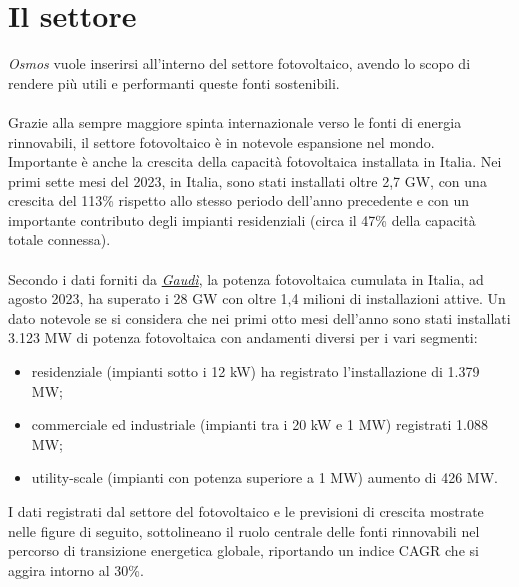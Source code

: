 \documentclass[a4paper, 12pt]{article}
\begin{document}
	\section{Il settore}
	\emph{Osmos} vuole inserirsi all'interno del settore fotovoltaico, avendo lo scopo di rendere più utili e performanti queste fonti sostenibili.\\\\
	Grazie alla sempre maggiore spinta internazionale verso le fonti di energia rinnovabili, il settore fotovoltaico è in notevole espansione nel mondo.\\
	Importante è anche la crescita della capacità fotovoltaica installata in Italia. Nei primi sette mesi del 2023, in Italia, sono stati installati oltre 2,7 GW, con una crescita del 113\% rispetto allo stesso periodo dell'anno precedente e con un importante contributo degli impianti residenziali (circa il 47\% della capacità totale connessa).\\\\
	Secondo i dati forniti da \href{https://www.terna.it/it/sistema-elettrico/dispacciamento/fonti-rinnovabili}{\emph{Gaudì}}, la potenza fotovoltaica cumulata in Italia, ad agosto 2023, ha superato i 28 GW con oltre 1,4 milioni di installazioni attive. Un dato notevole se si considera che nei primi otto mesi dell'anno sono stati installati 3.123 MW di potenza fotovoltaica con andamenti diversi per i vari segmenti:
	\begin{itemize}
		\item residenziale (impianti sotto i 12 kW) ha registrato l'installazione di 1.379 MW;
		\item commerciale ed industriale (impianti tra i 20 kW e 1 MW) registrati 1.088 MW;
		\item utility-scale (impianti con potenza superiore a 1 MW) aumento di 426 MW.
	\end{itemize}
	I dati registrati dal settore del fotovoltaico e le previsioni di crescita mostrate nelle figure di seguito, sottolineano il ruolo centrale delle fonti rinnovabili nel percorso di transizione energetica globale, riportando un indice CAGR che si aggira intorno al 30\%.
\end{document}
